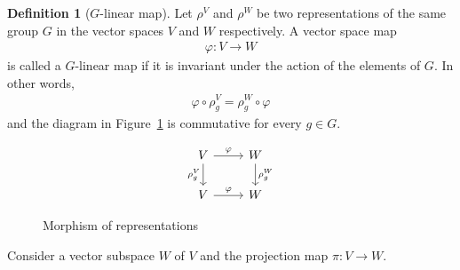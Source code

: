 \documentclass[12pt, a4paper, twoside]{article}
\theoremstyle{definition}
\newtheorem{definition}{Definition}[section]
\theoremstyle{remark}
\numberwithin{equation}{section}
\newcommand{\1}{\mathbf{1}}
\newcommand{\0}{\mathbf{0}}
\begin{document}
		\begin{definition}[$G$-linear map]\cite{FultonHarris}
			Let $\rho^V$ and $\rho^W$ be two representations of the same group $G$ in the vector spaces $V$ and $W$ respectively. A vector space map
			\begin{align*}
				\varphi: V \rightarrow W
			\end{align*} 
			is called a $G$-linear map if it is invariant under the action of the elements of $G$. In other words, 
			\begin{align*}
				\varphi \circ \rho^V_g = \rho^W_g \circ \varphi
			\end{align*}
			and	the diagram in Figure~\ref*{fig:commapmorp} is commutative for every $g \in G$.
			\begin{figure}[hbt!]
				\centering
				\[\begin{tikzcd}
					V \arrow{r}{\varphi} \arrow[swap]{d}{\rho^V_g} & W \arrow{d}{\rho^W_g} \\
					V \arrow{r}{\varphi} & W
				\end{tikzcd}\]
				\caption{Morphism of representations}
				\label{fig:commapmorp}
			\end{figure}
		\end{definition}
		
		Consider a vector subspace $W$ of $V$ and the projection map $\pi: V \rightarrow W$.
		
		
		
		
		


\clearpage{\thispagestyle{empty}}



% 
\end{document}
